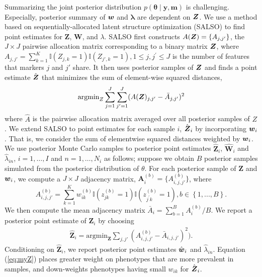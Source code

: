 \documentclass[12pt,]{article}
\newcommand{\bc}[1]{ \left\{#1\right\} }
\def\btheta{\bm{\theta}}
\def\y{\bm{y}}
\newcommand\m{\bm{m}}
\newcommand{\Ind}[1]{\mathbbm{1}\bc{#1}}
\def\Z{\bm{Z}}
\newcommand{\bZ}{\mbox{\boldmath $Z$}}
\newcommand{\bw}{\mbox{\boldmath $w$}}
\begin{document}
Summarizing the joint posterior distribution $p(\btheta \mid \y, \m)$ is
challenging.  Especially, posterior summary of $\bw$ and $\bm \lambda$ are
dependent on $\bZ$. We use a method based on sequentially-allocated latent
structure optimization (SALSO) \citep{salso} to find point estimates for $\Z$,
$\bm W$, and $\lambda$.  SALSO first constructs $A(\bZ)=\{A_{j,j'}\}$, the $J
\times J$ pairwise allocation matrix corresponding to a binary matrix $\bZ$,
where  $A_{j,j'} = \sum_{k=1}^K \mathbb{I}(Z_{j,k}=1)\mathbb{I}(Z_{j',k}=1),
1\leq j, j^\prime \leq J$ is the number of features that markers $j$ and $j'$
share. It then uses posterior samples of $\bZ$ and finds a point estimate
$\hat{\bZ}$ that minimizes the sum of element-wise squared distances, 
\begin{eqnarray*}
\text{argmin}_Z\sum_{j=1}^J\sum_{j'=1}^J(A(\bZ)_{j,j'} - \bar{A}_{j,j'})^2
\label{eq:salso}
\end{eqnarray*}
%
where $\hat A$ is the pairwise allocation matrix averaged over all posterior
samples of $Z$.  %
%
We extend SALSO to point estimates for each sample $i$, $\hat{\bZ}_i$ by
incorporating $\bw_i$. That is, we consider the sum of elementwise squared
distances weighted by $\bw_i$.  We use posterior Monte Carlo samples to
posterior point estimates $\hat{\Z}_i$, $\hat{\bm W}_i$ and
$\hat{\lambda}_{in}$, $i=1, \ldots, I$ and $n=1, \ldots, N_i$ as follows;
suppose we obtain \(B\) posterior samples simulated from the posterior
distribution of \(\theta\). For each posterior sample of \(\Z\) and \(\bw_i\),
we compute a $J \times J$ adjacency matrix, \(\bm A_i^{(b)}
=\{A^{(b)}_{i,j,j'}\}\), where 
%
\[
A^{(b)}_{i,j,j'} = \sum_{k=1}^K w^{(b)}_{ik} 
\mathbb{I}\left( z^{(b)}_{jk} = 1\right)
\mathbb{I}\left(z^{(b)}_{j^\prime k} = 1\right), b \in \bc{1,...,B}.
\]
We then compute the mean adjacency matrix \(\bar A_i = \sum_{b=1}^B A_i^{(b)} /
B\).  We report a posterior point estimate of $\Z_i$ by choosing
\begin{eqnarray}
\hat{\bm Z}_i = \text{argmin}_{\bm Z} \sum_{j,j'} (A_{i,j,j'}^{(b)} - \bar
A_{i,j,j'})^2).\label{eq:myZ}
\end{eqnarray}
Conditioning on $\hat{\Z}_i$, we report posterior point estimates $\hat{\bw}_i$
and $\hat{\lambda}_{in}$.
Equation (\eqref{eq:myZ}) places greater weight on phenotypes that are more
prevalent in samples, and down-weights phenotypes having small $w_{ik}$ for
$\hat{\bZ}_i$.
\end{document}
